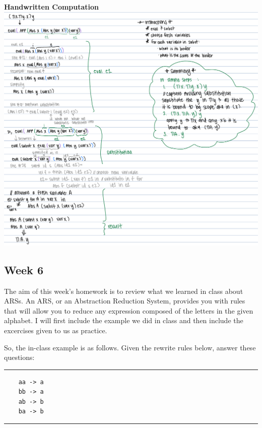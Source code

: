 \documentclass{article}
\theoremstyle{theorem}
\theoremstyle{definition}
\theoremstyle{remark}
\begin{document}
\begin{samepage}
  \begin{center}
    \textbf{Handwritten Computation}
    \includegraphics[width=15cm]{Week5hw_handwrittenInterpreter.jpg}
  \end{center}
\end{samepage}

\subsection{Week 6}

The aim of this week's homework is to review what we learned in class about ARSs. An ARS, or an Abstraction Reduction System, provides you with rules that will allow you to reduce any expression composed of the letters in the given alphabet. I will first include the example we 
did in class and then include the excercises given to us as practice. 

So, the in-class example is as follows. Given the rewrite rules below, answer these questions: \\
\noindent
  {\color{gray} \rule{\linewidth}{0.05mm}}
\begin{center}
  \begin{verbatim}
    aa -> a 
    bb -> a 
    ab -> b
    ba -> b 
  \end{verbatim}
\end{center}
\noindent
  {\color{gray} \rule{\linewidth}{0.05mm}}
\end{document}
